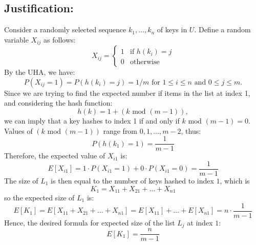 \documentclass[12pt, b5paper]{article}
\begin{document}
\subsection*{Justification:} 
Consider a randomly selected sequence $k_1, \ldots, k_n$ of keys in $U$. Define a random variable $X_{ij}$ as follows:
$$
X_{ij} = 
\begin{cases}
    1 & \text{if } h(k_i) = j \\
    0 & \text{otherwise } 
\end{cases}
$$
By the UHA, we have: $$ P(X_{ij} = 1) = P(h(k_i) = j) = 1/m 
\text{ for } 1 \leq i \leq n \text{ and } 0 \leq j \leq m.
$$
Since we are trying to find the expected number if items in the list at index 1, and 
considering the hash function: 
$$ h(k) = 1 + (k \text{ mod } (m-1)), $$
we can imply that a key hashes to index 1 if and only if $k \text{ mod } (m-1) = 0$.\\
Values of $(k\text{ mod }(m-1))$ range from $0, 1, \ldots, m-2$, thus: 
$$ P(h(k_1)=1) = \frac{1}{m-1} $$
Therefore, the expected value of $X_{i1}$ is:
$$ E[X_{i1}] = 1 \cdot P(X_{i1} = 1) + 0 \cdot P(X_{i1} = 0) = \frac{1}{m-1} $$
The size of $L_1$ is then equal to the number of keys hashed to index $1$, which is
$$K_1 = X_{11} + X_{21} + \ldots + X_{n1}$$
so the expected size of $L_1$ is: 
$$E[K_1] = E[X_{11} + X_{21} + \ldots + X_{n1}] = E[X_{11}] + \ldots + E[X_{n1}] = n \cdot \frac{1}{m-1}$$
Hence, the desired formula for expected size of the list $L_j$ at index $1$: 
 \[
 \boxed{E[K_1] =\frac{n}{m-1}} 
 \]
\end{document}

